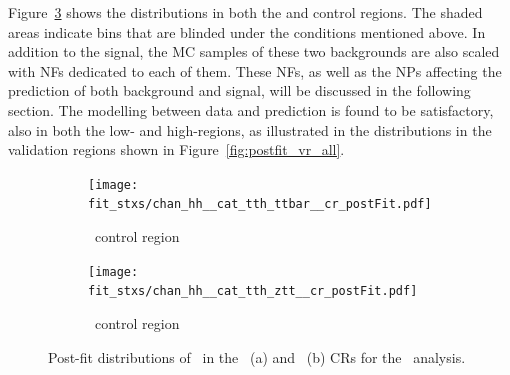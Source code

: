 Figure~\ref{fig:postfit_cr_both} shows the \mtt distributions in both the \ztautau and \ttbar control regions. The shaded areas indicate bins that are blinded under the conditions mentioned above. In addition to the signal, the MC samples of these two backgrounds are also scaled with NFs dedicated to each of them. These NFs, as well as the NPs affecting the prediction of both background and signal, will be discussed in the following section. The modelling between data and prediction is found to be satisfactory, also in both the low- and high-\pth regions, as illustrated in the \mtt distributions in the validation regions shown in Figure~\ref{fig:postfit_vr_all}.
\begin{figure}[htbp]
  \centering

  \begin{subfigure}[b]{0.48\textwidth}
    \centering
    \texttt{[image: fit\_stxs/chan\_hh\_\_cat\_tth\_ttbar\_\_cr\_postFit.pdf]}
    \caption{\small \ttbar\ control region}
    \label{fig:postfit_cr_ttbar}
  \end{subfigure}\hfill
  \begin{subfigure}[b]{0.48\textwidth}
    \centering
    \texttt{[image: fit\_stxs/chan\_hh\_\_cat\_tth\_ztt\_\_cr\_postFit.pdf]}
    \caption{\small \ztautau\ control region}
    \label{fig:postfit_cr_ztt}
  \end{subfigure}

  \caption{Post-fit distributions of \mmc\ in the \ttbar\ (a) and \ztautau\ (b) CRs for the \ttH\ analysis.}
  \label{fig:postfit_cr_both}
\end{figure}

